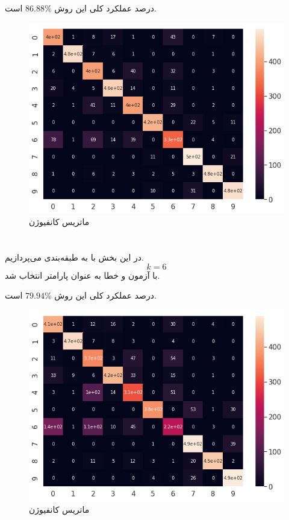 \documentclass[a4paper]{article}
\begin{document}
\begin{large}
درصد عملکرد کلی این روش
$86.88\%$
است.

\begin{figure}[h!]
	\centering
	\includegraphics[scale=0.6]{RBFSVM.png}
	\caption{ماتریس کانفیوژن 
	}
\end{figure}
\newpage
\section{}
در این بخش با 
به طبقه‌بندی می‌پردازیم. 
$$k = 6$$
با آزمون و خطا به عنوان پارامتر‌ انتخاب شد.

درصد عملکرد کلی این روش
$79.94\%$
است.

\begin{figure}[h!]
	\centering
	\includegraphics[scale=0.6]{kNN.png}
	\caption{ماتریس کانفیوژن 
	}
\end{figure}


\end{large}
\end{document}
